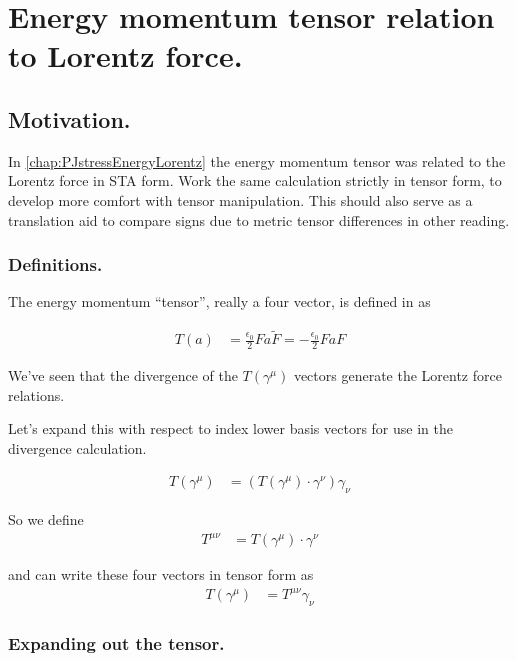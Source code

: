 \chapter{Energy momentum tensor relation to Lorentz force. }

\section{Motivation. }

In \ref{chap:PJstressEnergyLorentz} the energy momentum tensor was related
to the Lorentz force in STA form.  Work the same calculation strictly in
tensor form, to
develop more comfort with tensor manipulation.  This should also serve
as a translation aid to compare signs due to metric tensor differences 
in other reading.

\subsection{Definitions. }

The energy momentum ``tensor'', really a four vector, is defined
in \cite{doran2003gap}
as

\begin{align}
T(a) &= 
\frac{\epsilon_0}{2} F a \tilde{F} = -\frac{\epsilon_0}{2} F a {F} 
\end{align}

We've seen that the divergence of the $T(\gamma^\mu)$ vectors generate
the Lorentz force relations.

Let's expand this with respect to index lower basis vectors for use in the
divergence calculation.

\begin{align}
T(\gamma^\mu) &= (T(\gamma^\mu) \cdot \gamma^\nu) \gamma_\nu 
\end{align}

So we define
\begin{align}
T^{\mu \nu} 
&= T(\gamma^\mu) \cdot \gamma^\nu
\end{align}

and can write these four vectors in tensor form as
\begin{align}
T(\gamma^\mu) &= T^{\mu \nu} \gamma_\nu 
\end{align}

\subsection{Expanding out the tensor. }

